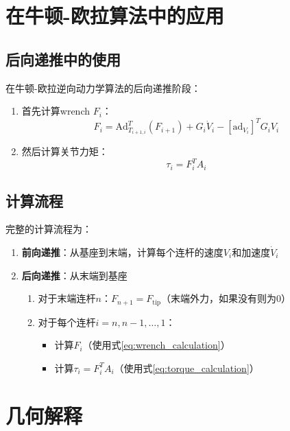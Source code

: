 \documentclass[12pt,a4paper]{article}
\begin{document}
\section{在牛顿-欧拉算法中的应用}

\subsection{后向递推中的使用}

在牛顿-欧拉逆向动力学算法的后向递推阶段：

\begin{enumerate}
\item 首先计算wrench $F_i$：
\begin{equation}
F_i = \text{Ad}_{T_{i+1,i}}^T(F_{i+1}) + G_i \dot{V}_i - [\text{ad}_{V_i}]^T G_i V_i
\label{eq:wrench_calculation}
\end{equation}

\item 然后计算关节力矩：
\begin{equation}
\tau_i = F_i^T A_i
\label{eq:torque_calculation}
\end{equation}
\end{enumerate}

\subsection{计算流程}

完整的计算流程为：

\begin{enumerate}
\item \textbf{前向递推}：从基座到末端，计算每个连杆的速度$V_i$和加速度$\dot{V}_i$

\item \textbf{后向递推}：从末端到基座
\begin{enumerate}
\item 对于末端连杆$n$：$F_{n+1} = F_{\text{tip}}$（末端外力，如果没有则为0）
\item 对于每个连杆$i = n, n-1, \ldots, 1$：
\begin{itemize}
\item 计算$F_i$（使用式\ref{eq:wrench_calculation}）
\item 计算$\tau_i = F_i^T A_i$（使用式\ref{eq:torque_calculation}）
\end{itemize}
\end{enumerate}
\end{enumerate}

\section{几何解释}
\end{document}

